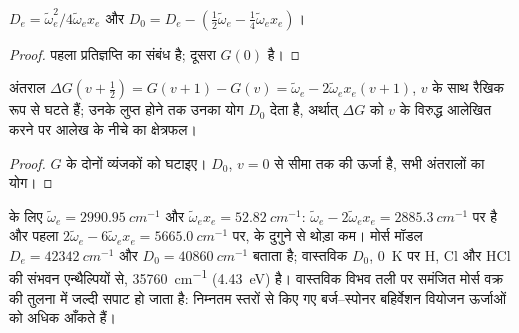 \begin{corollary}[मोर्स दोलित्र के $D_e$ और $D_0$]\label{cor:b3:rovibrational-spectroscopy:de}
$D_e = \tilde\omega_e^2/4\tilde\omega_ex_e$ और $D_0 = D_e - (\frac12\tilde\omega_e -
\frac14\tilde\omega_ex_e)$।
\end{corollary}

\begin{proof}
पहला प्रतिज्ञप्ति का संबंध है; दूसरा $G(0)$ है।
\end{proof}

\begin{proposition}[बर्ज--स्पोनर बहिर्वेशन]\label{prop:b3:rovibrational-spectroscopy:birge-sponer}
अंतराल $\Delta G(v + \frac12) = G(v+1) - G(v) = \tilde\omega_e - 2\tilde\omega_ex_e(v +
1)$, $v$ के साथ रैखिक रूप से घटते हैं; उनके लुप्त होने तक उनका योग $D_0$ देता है,
अर्थात् $\Delta G$ को $v$ के विरुद्ध आलेखित करने पर आलेख के नीचे का क्षेत्रफल।
\end{proposition}

\begin{proof}
$G$ के दोनों व्यंजकों को घटाइए। $D_0$, $v = 0$ से
सीमा तक की ऊर्जा है, सभी अंतरालों का योग।
\end{proof}

\begin{example}[हाइड्रोजन क्लोराइड]\label{ex:b3:rovibrational-spectroscopy:hcl}
 के लिए $\tilde\omega_e = \qty{2990.95}{cm^{-1}}$ और $\tilde\omega_ex_e =
\qty{52.82}{cm^{-1}}$:  $\tilde\omega_e - 2\tilde\omega_ex_e =
\qty{2885.3}{cm^{-1}}$ पर है और पहला  $2\tilde\omega_e - 6\tilde\omega_ex_e =
\qty{5665.0}{cm^{-1}}$ पर,  के दुगुने से थोड़ा कम। मोर्स मॉडल
$D_e = \qty{42342}{cm^{-1}}$ और $D_0 = \qty{40860}{cm^{-1}}$ बताता है; वास्तविक $D_0$,
\qty{0}{K} पर H, Cl और HCl की संभवन एन्थैल्पियों से,
\qty{35760}{cm^{-1}} (\qty{4.43}{eV}) है। वास्तविक विभव तली पर समंजित मोर्स वक्र
की तुलना में जल्दी सपाट हो जाता है: निम्नतम स्तरों से किए गए बर्ज--स्पोनर
बहिर्वेशन वियोजन ऊर्जाओं को अधिक आँकते हैं।
\end{example}

